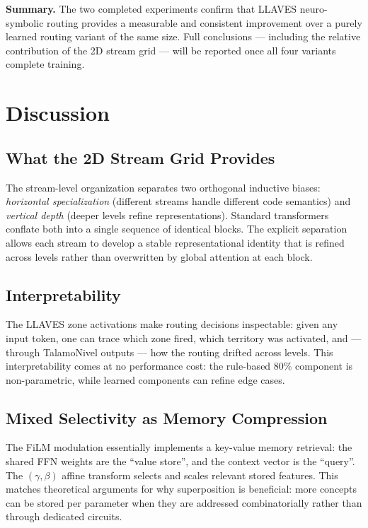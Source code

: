\documentclass[11pt,a4paper]{article}
\begin{document}
\textbf{Summary.}
The two completed experiments confirm that LLAVES neuro-symbolic routing
provides a measurable and consistent improvement over a purely learned
routing variant of the same size.  Full conclusions — including the relative
contribution of the 2D stream grid — will be reported once all four variants
complete training.

\section{Discussion}
\label{sec:discussion}

\subsection{What the 2D Stream Grid Provides}

The stream-level organization separates two orthogonal inductive biases:
\emph{horizontal specialization} (different streams handle different code
semantics) and \emph{vertical depth} (deeper levels refine representations).
Standard transformers conflate both into a single sequence of identical blocks.
The explicit separation allows each stream to develop a stable representational
identity that is refined across levels rather than overwritten by global
attention at each block.

\subsection{Interpretability}

The LLAVES zone activations make routing decisions inspectable: given any
input token, one can trace which zone fired, which territory was activated,
and — through TalamoNivel outputs — how the routing drifted across levels.
This interpretability comes at no performance cost: the rule-based 80\%
component is non-parametric, while learned components can refine edge cases.

\subsection{Mixed Selectivity as Memory Compression}

The FiLM modulation essentially implements a key-value memory retrieval:
the shared FFN weights are the ``value store'', and the context vector is the
``query''.  The $(\gamma, \beta)$ affine transform selects and scales relevant
stored features.  This matches theoretical arguments for why superposition
\citep{elhage2022toy} is beneficial: more concepts can be stored per parameter
when they are addressed combinatorially rather than through dedicated circuits.
\end{document}
